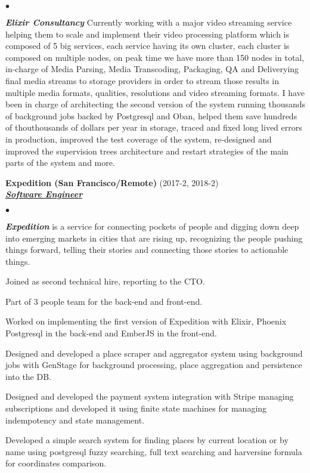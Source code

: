 \documentclass[a4paper]{article}
\newcommand{\employer}[3]{{
  \textbf{#1} (#2)\\ \underline{\textbf{\emph{#3}}}\\ }}
\newenvironment{achievements}{\begin{list}{$\bullet$}{\topsep 0pt \itemsep
  -2pt}}{\vspace*{4pt}\end{list}}
\newcommand{\emphasys}[1]{\textbf{\emph{#1}}}
\begin{document}
\begin{achievements}
  \item \emphasys{Elixir Consultancy} Currently working with a major video streaming service helping them to scale and implement their video processing platform which is composed of 5 big services, each service having its own cluster, each cluster is composed on multiple nodes, on peak time we have more than 150 nodes in total, in-charge of Media Parsing, Media Transcoding, Packaging, QA and Deliverying final media streams to storage providers in order to stream those results in multiple media formats, qualities, resolutions and video streaming formats. I have been in charge of architecting the second version of the system running thousands of background jobs backed by Postgresql and Oban, helped them save hundreds of thouthousands of dollars per year in storage, traced and fixed long lived errors in production, improved the test coverage of the system, re-designed and improved the supervision trees architecture and restart strategies of the main parts of the system and more.
  \end{achievements}

  \employer{ Expedition (San Francisco/Remote)}{2017-2, 2018-2}{Software Engineer}
  \begin{achievements}
  \item \emphasys{Expedition} is a service for connecting pockets of people and digging down deep into emerging markets in cities that are rising up, recognizing the people pushing things forward, telling their stories and connecting those stories to actionable things.
  \item Joined as second technical hire, reporting to the CTO.
  \item Part of 3 people team for the back-end and front-end.
  \item Worked on implementing the first version of Expedition with Elixir, Phoenix Postgresql in the back-end and EmberJS in the front-end.
  \item Designed and developed a place scraper and aggregator system using background jobs with GenStage for background processing, place aggregation and persistence into the DB.
  \item Designed and developed the payment system integration with Stripe managing subscriptions and developed it using finite state machines for managing indempotency and state management.
  \item Developed a simple search system for finding places by current location or by name using postgresql fuzzy searching, full text searching and harversine formula for coordinates comparison.
  \end{achievements}
\end{document}
